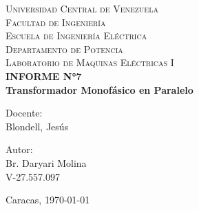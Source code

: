 \begin{titlepage}
    \begin{center}
        \textsc{ Universidad Central de Venezuela}\\
        \textsc{ Facultad de Ingeniería}\\
        \textsc{ Escuela de Ingeniería Eléctrica}\\
        \textsc{ Departamento de Potencia}\\
        \textsc{ Laboratorio de Maquinas Eléctricas I}\\[7cm]
        
        {\Large \bfseries INFORME N°7}\\[0.2cm]
        {\Large \bfseries Transformador Monofásico en Paralelo}\\[9cm]
        
        \begin{minipage}{0.4\textwidth}
            \begin{flushleft}
                {Docente:}\\
                Blondell, Jesús 
            \end{flushleft}
        \end{minipage}
        \begin{minipage}{0.4\textwidth}
            \begin{flushright}
                {Autor:}\\
                Br. Daryari Molina\\
                V-27.557.097
            \end{flushright}
        \end{minipage}
        
        \vfill
        
        { Caracas, \today} %
    \end{center}
\end{titlepage}